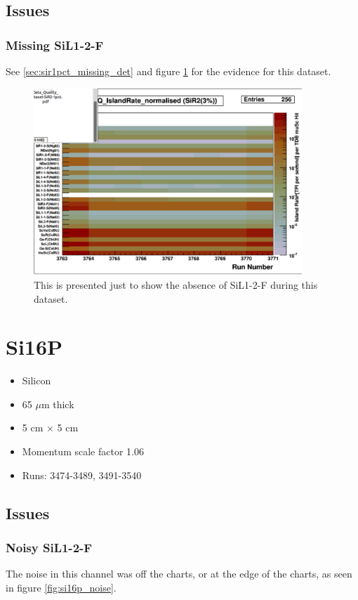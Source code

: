 \documentclass[a4paper]{article}
\begin{document}
\subsection{Issues}
\subsubsection{Missing SiL1-2-F}
See \ref{sec:sir1pct_missing_det} and figure \ref{fig:sir3pct_rates} for the evidence for this dataset.

\begin{figure}
  \centering
  \includegraphics[width=0.9\textwidth]{figs/sir3pct/rates}
  \caption{This is presented just to show the absence of SiL1-2-F during this dataset.}
  \label{fig:sir3pct_rates}
\end{figure}


\section{Si16P}
\begin{itemize}
  \item Silicon
  \item 65 $\mu$m thick
  \item 5 cm $\times$ 5 cm
  \item Momentum scale factor 1.06
  \item Runs:
    3474-3489, 3491-3540
\end{itemize}


\subsection{Issues}
\subsubsection{Noisy SiL1-2-F}
The noise in this channel was off the charts, or at the edge of the charts, as seen
in figure \ref{fig:si16p_noise}.
\end{document}
